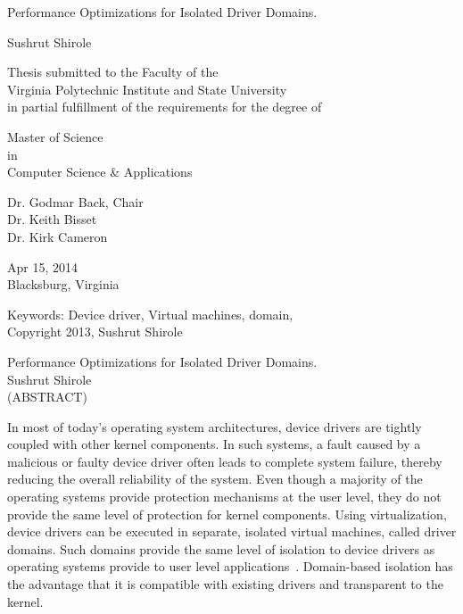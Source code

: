 \documentclass[12pt]{report}
\begin{document}
\thispagestyle{empty}
\begin{center}

{\Large 
Performance Optimizations for Isolated Driver Domains.
}

\vfill

Sushrut Shirole

\vfill

Thesis submitted to the Faculty of the \\
Virginia Polytechnic Institute and State University \\
in partial fulfillment of the requirements for the degree of

\vfill

Master of Science \\
in \\
Computer Science \& Applications

\vfill

Dr. Godmar Back, Chair \\
Dr. Keith Bisset \\
Dr. Kirk Cameron\\


\vfill

Apr 15, 2014 \\
Blacksburg, Virginia

\vfill

Keywords: Device driver, Virtual machines, domain,  
\\
Copyright 2013, Sushrut Shirole

\end{center}

\pagebreak

\thispagestyle{empty}
\begin{center}

{\large 
Performance Optimizations for Isolated Driver Domains.
}
\\[8mm]
Sushrut Shirole
\\[8mm]
(ABSTRACT)
\\[10mm]
\end{center}
In most of today's operating system architectures, device drivers are
tightly coupled with other kernel components. In such systems, a fault
caused by a malicious or faulty device driver often leads to complete 
system failure, thereby reducing
the overall reliability of the system. Even though a majority of the operating
systems provide protection mechanisms at the user level, they do not
provide the same level of protection for kernel components.  
Using virtualization, device drivers can be executed in separate,
isolated virtual machines, called driver domains.  Such domains
provide the same level of isolation to device drivers as operating
systems provide to user level applications~\cite{Fraser04safehardware}.
Domain-based isolation has the advantage that it is compatible
with existing drivers and transparent to the kernel.
\end{document}
